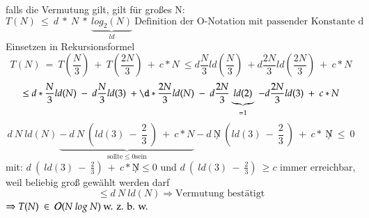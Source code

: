 \begin{itemize}
        falls die Vermutung gilt, gilt für großes N:
        \[ T(N)\ \leq\ d\ *\ N\ *\ \underbrace{log_2(N)}_{ld}\ \text{Definition der O-Notation mit passender Konstante d}\]
        Einsetzen in Rekursionsformel
        \[ T(N)\ =\ T\left(\frac{N}{3}\right)\ +\ T\left(\frac{2N}{3}\right)\ +\ c*N \ \leq d \frac{N}{3} ld\left(\frac{N}{3}\right)\ + d\frac{2N}{3} ld\left(\frac{2N}{3}\right)\ +\ c*N\]
        \[ \leq d*\frac{N}{3} ld(N)\ -\ d\frac{N}{3} ld(3)\ +\d*\frac{2N}{3} ld(N)\ -\ d\frac{2N}{3} \underbrace{ld(2)}_{=1}\ - d\frac{2N}{3} ld(3)\ +\ c*N \]
        \[ d\ N\ ld(N)\ \underbrace{-\ d\ N\ \left(ld(3)\ -\ \frac{2}{3}\ \right)\ +\ c*N}_{\text{sollte} \leq 0\text{sein}} - d\ \not N\  \left(ld(3)\ - \ \frac{2}{3}\ \right)\ +\ c*\ \not N\ \leq\ 0\]
        mit:
        \hspace*{1cm} $d\ \left(\ ld(3)\ -\ \frac{2}{3}\right)\ +\ c* \not N \leq 0$ und $d\ \left(\ ld(3)\ -\ \frac{2}{3}\right)\ \geq c$ immer erreichbar, weil beliebig groß gewählt werden darf
        \[ \leq d\ N\ ld(N) \Rightarrow \text{Vermutung bestätigt}\]
        $\Rightarrow T(N)\ \in\ \bigO{}(N\ log\ N)\  \text{w. z. b. w.}$
    \end{itemize}


